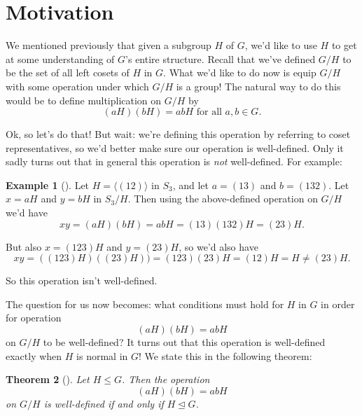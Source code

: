 \documentclass[10pt,]{book}
\theoremstyle{plain}
\newtheorem{theorem}{Theorem}[section]
\theoremstyle{definition}
\theoremstyle{definition}
\theoremstyle{definition}
\newtheorem{example}[theorem]{Example}
\theoremstyle{definition}
\numberwithin{equation}{section}
\begin{document}
\section[{Motivation}]{Motivation}\label{section-25}
We mentioned previously that given a subgroup \(H\) of \(G\), we'd like to use \(H\) to get at some understanding of \(G\)'s entire structure. Recall that we've defined \(G/H\) to be the set of all left cosets of \(H\) in \(G\). What we'd like to do now is equip \(G/H\) with some operation under which \(G/H\) is a group! The natural way to do this would be to define multiplication on \(G/H\) by%
\begin{equation*}
(aH)(bH)=abH \text{ for all } a,b\in G.
\end{equation*}
%
\par
Ok, so let's do that! But wait: we're defining this operation by referring to coset representatives, so we'd better make sure our operation is well-defined. Only it sadly turns out that in general this operation is \emph{not} well-defined. For example:%
\begin{example}[]\label{example-78}
Let \(H=\langle (12)\rangle\) in \(S_3\), and let \(a=(13)\) and \(b=(132)\). Let \(x=aH\) and \(y=bH\) in \(S_3/H\). Then using the above-defined operation on \(G/H\) we'd have%
\begin{equation*}
xy=(aH)(bH)=abH=(13)(132)H=(23)H.
\end{equation*}
%
\par
But also \(x=(123)H\) and \(y=(23)H\), so we'd also have%
\begin{equation*}
xy=((123)H)((23)H))=(123)(23)H=(12)H=H\neq (23)H.
\end{equation*}
%
\par
So this operation isn't well-defined.%
\end{example}
The question for us now becomes: what conditions must hold for \(H\) in \(G\) in order for operation%
\begin{equation*}
(aH)(bH)=abH
\end{equation*}
on \(G/H\) to be well-defined? It turns out that this operation is well-defined exactly when \(H\) is normal in \(G\)! We state this in the following theorem:%
\begin{theorem}[{}]\label{cmwd}
Let \(H\leq G\). Then the operation%
\begin{equation*}
(aH)(bH)=abH
\end{equation*}
on \(G/H\) is well-defined if and only if \(H \unlhd G\).%
\end{theorem}
\end{document}
